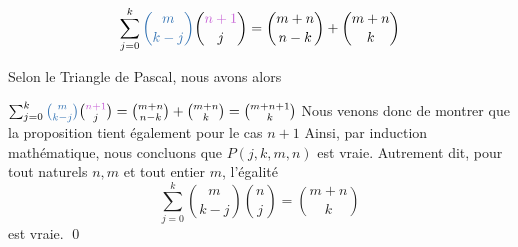 \documentclass[16pt]{report}
\begin{document}
\begin{multicols*}{2}
\begin{Preuve*}{}{}
        \begin{align}
            \sum_{j=0}^{k} \textcolor{myb}{{m \choose k-j}} {\textcolor{myp}{n+1} \choose j} = {m + n \choose n - k} 
            + {m+n \choose k}
        \end{align}


        Selon le Triangle de Pascal, nous avons alors 

            $\sum_{j=0}^{k} \textcolor{myb}{{m \choose k-j}} {\textcolor{myp}{n+1} \choose j} = {m + n \choose n - k} 
            + {m+n \choose k} = {m+n+1 \choose k}$ Nous venons donc de montrer que la proposition tient 
            également pour le cas $n+1$ Ainsi, par induction mathématique, nous concluons que $P(j,k,m, n)$ est vraie. 
            Autrement dit, pour tout naturels $n, m$ et tout entier $m$, l'égalité 
                \[ \sum_{j=0}^{k} {m \choose k-j} {n \choose j} = {m+n \choose k} \]
            est vraie. \qed 
        \end{Preuve*}
\end{multicols*}  
\end{document}
